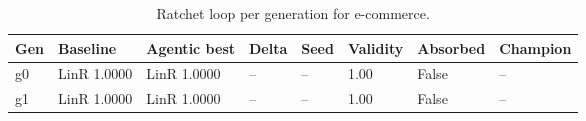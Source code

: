 \begin{table}[H]
\centering\small
\caption{Ratchet loop per generation for e-commerce.}
\label{tab:ratchet-generations-ratchet-ledger-e-commerce}
\begin{tabular}{llllllll}
\toprule
Gen & Baseline & Agentic best & Delta & Seed & Validity & Absorbed & Champion \\
\midrule
g0 & LinR 1.0000 & LinR 1.0000 & -- & -- & 1.00 & False & -- \\
g1 & LinR 1.0000 & LinR 1.0000 & -- & -- & 1.00 & False & -- \\
\bottomrule
\end{tabular}
\end{table}
